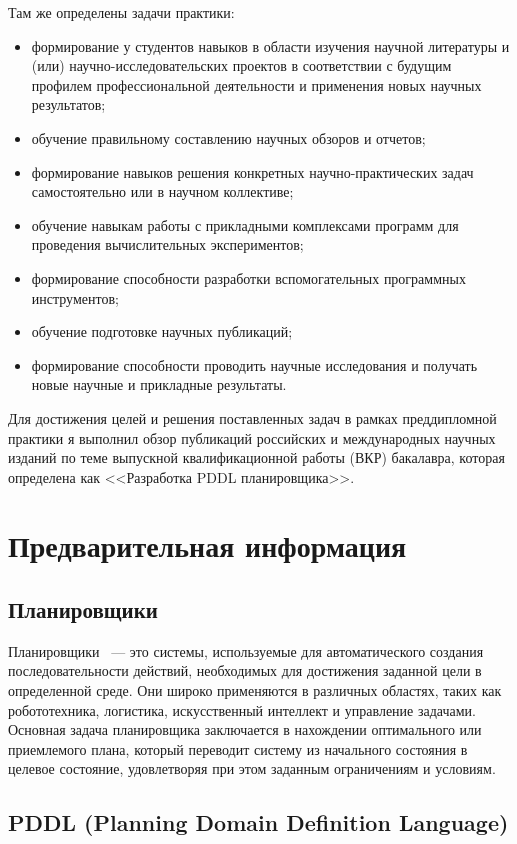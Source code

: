 \documentclass{article}
\begin{document}
    Там же определены задачи практики:
\begin{itemize}
\item формирование у студентов навыков в области изучения научной литературы и (или) научно-исследовательских проектов в соответствии с будущим профилем профессиональной деятельности и применения новых научных результатов;
\item обучение правильному составлению научных обзоров и отчетов;
\item формирование навыков решения конкретных научно-практических задач самостоятельно или в научном коллективе;
\item обучение навыкам работы с прикладными комплексами программ для проведения вычислительных экспериментов;
\item формирование способности разработки вспомогательных программных инструментов;
\item обучение подготовке научных публикаций;
\item формирование способности проводить научные исследования и получать новые научные и прикладные результаты.
\end{itemize}

    Для достижения целей и решения поставленных задач в рамках преддипломной практики я выполнил обзор публикаций российских и международных научных изданий по теме выпускной квалификационной работы (ВКР) бакалавра, которая определена как <<Разработка PDDL планировщика>>.

\newpage

\section{Предварительная информация}

\subsection{Планировщики}
Планировщики~\cite{ghallab2004automated} — это системы, используемые для автоматического создания последовательности действий, необходимых для достижения заданной цели в определенной среде. Они широко применяются в различных областях, таких как робототехника, логистика, искусственный интеллект и управление задачами. Основная задача планировщика заключается в нахождении оптимального или приемлемого плана, который переводит систему из начального состояния в целевое состояние, удовлетворяя при этом заданным ограничениям и условиям.

\subsection{PDDL (Planning Domain Definition Language)}
\end{document}

